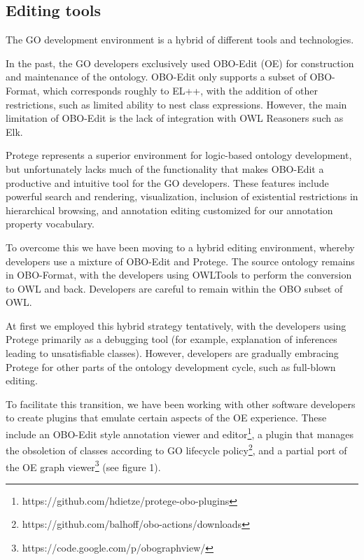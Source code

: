 \documentclass{llncs}
\begin{document}
\subsection{Editing tools}

The GO development environment is a hybrid of different tools and
technologies.

In the past, the GO developers exclusively used
OBO-Edit (OE)\cite{Day-Richter2007} for construction and maintenance of the
ontology. OBO-Edit only supports a subset of OBO-Format, which
corresponds roughly to EL++, with the addition of other restrictions,
such as limited ability to nest class expressions. However, the main
limitation of OBO-Edit is the lack of integration with OWL Reasoners
such as Elk.

Protege represents a superior environment for logic-based ontology
development, but unfortunately lacks much of the functionality that
makes OBO-Edit a productive and intuitive tool for the GO
developers. These features include powerful search and rendering,
visualization, inclusion of existential restrictions in hierarchical
browsing, and annotation editing customized for our annotation property vocabulary.


To overcome this we have been moving to a hybrid editing environment,
whereby developers use a mixture of OBO-Edit and Protege. The source
ontology remains in OBO-Format, with the developers using 
OWLTools\cite{OWLTools} to perform the conversion to OWL and
back. Developers are careful to remain within the OBO subset of OWL. 

At first we employed this hybrid strategy tentatively, with the
developers using Protege primarily as a debugging tool (for example,
explanation of inferences leading to unsatisfiable classes). However,
developers are gradually embracing Protege for other parts of the
ontology development cycle, such as full-blown editing.

To facilitate this transition, we have been working with other
software developers to create plugins that emulate certain aspects of
the OE experience. These include an OBO-Edit style annotation viewer and
editor\footnote{https://github.com/hdietze/protege-obo-plugins}, a
plugin that manages the obsoletion of classes according to GO
lifecycle policy\footnote{https://github.com/balhoff/obo-actions/downloads}, and a partial
port of the OE graph
viewer\footnote{https://code.google.com/p/obographview/} (see figure 1).
\end{document}
